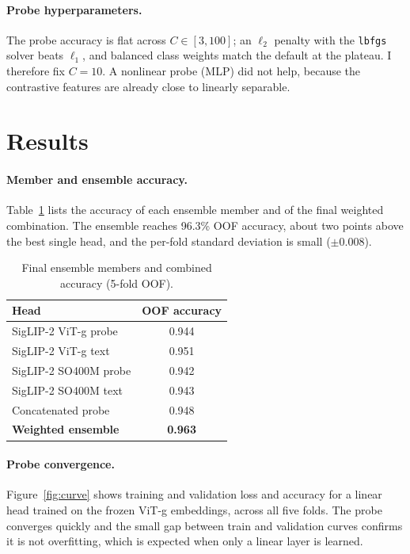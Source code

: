 \documentclass[11pt]{article}
\begin{document}
\paragraph{Probe hyperparameters.} The probe accuracy is flat across $C \in [3,
100]$; an $\ell_2$ penalty with the \texttt{lbfgs} solver beats $\ell_1$, and
balanced class weights match the default at the plateau. I therefore fix $C=10$.
A nonlinear probe (MLP) did not help, because the contrastive features are already
close to linearly separable.

\section{Results}

\paragraph{Member and ensemble accuracy.} Table~\ref{tab:members} lists the
accuracy of each ensemble member and of the final weighted combination. The
ensemble reaches 96.3\% OOF accuracy, about two points above the best single head,
and the per-fold standard deviation is small ($\pm 0.008$).

\begin{table}[t]
\centering
\caption{Final ensemble members and combined accuracy (5-fold OOF).}
\label{tab:members}
\begin{tabular}{lc}
\toprule
Head & OOF accuracy \\
\midrule
SigLIP-2 ViT-g probe        & 0.944 \\
SigLIP-2 ViT-g text         & 0.951 \\
SigLIP-2 SO400M probe       & 0.942 \\
SigLIP-2 SO400M text        & 0.943 \\
Concatenated probe          & 0.948 \\
\midrule
\textbf{Weighted ensemble}  & \textbf{0.963} \\
\bottomrule
\end{tabular}
\end{table}

\paragraph{Probe convergence.} Figure~\ref{fig:curve} shows training and
validation loss and accuracy for a linear head trained on the frozen ViT-g
embeddings, across all five folds. The probe converges quickly and the small
gap between train and validation curves confirms it is not overfitting, which is
expected when only a linear layer is learned.
\end{document}
